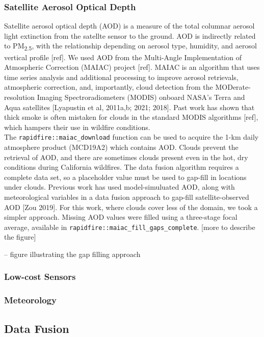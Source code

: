 \documentclass[gmd, manuscript]{copernicus}
\begin{document}
\subsubsection{Satellite Aerosol Optical Depth}

Satellite aerosol optical depth (AOD) is a measure of the total columnar
aerosol light extinction from the satellte sensor to the ground. AOD is
indirectly related to PM\textsubscript{2.5}, with the relationship
depending on aerosol type, humidity, and aerosol vertical profile
{[}ref{]}. We used AOD from the Multi-Angle Implementation of
Atmospheric Correction (MAIAC) project {[}ref{]}. MAIAC is an algorithm
that uses time series analysis and additional processing to improve
aerosol retrievals, atmospheric correction, and, importantly, cloud
detection from the MODerate-resolution Imaging Spectroradiometers
(MODIS) onboard NASA's Terra and Aqua satellites {[}Lyapustin et al,
2011a,b; 2021; 2018{]}. Past work has shown that thick smoke is often
mistaken for clouds in the standard MODIS algorithms {[}ref{]}, which
hampers their use in wildfire conditions.\\
The \texttt{rapidfire::maiac\_download} function can be used to acquire
the 1-km daily atmosphere product (MCD19A2) which contains AOD. Clouds
prevent the retrieval of AOD, and there are sometimes clouds present
even in the hot, dry conditions during California wildfires. The data
fusion algorithm requires a complete data set, so a placeholder value
must be used to gap-fill in locations under clouds. Previous work has
used model-simuluated AOD, along with meteorological variables in a data
fusion approach to gap-fill satellite-observed AOD {[}Zou 2019{]}. For
this work, where clouds cover less of the domain, we took a simpler
approach. Missing AOD values were filled using a three-stage focal
average, available in \texttt{rapidfire::maiac\_fill\_gaps\_complete}.
{[}more to describe the figure{]}

-- figure illustrating the gap filling approach

\subsubsection{Low-cost Sensors}

\subsubsection{Meteorology}

\subsection{Data Fusion}
\end{document}
